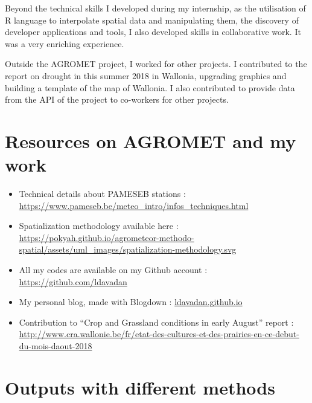 \documentclass[12pt,twoside]{reedthesis}
\theoremstyle{definition}
\theoremstyle{definition}
\theoremstyle{definition}
\theoremstyle{remark}
\begin{document}
Beyond the technical skills I developed during my internship, as the
utilisation of R language to interpolate spatial data and manipulating
them, the discovery of developer applications and tools, I also
developed skills in collaborative work. It was a very enriching
experience.

Outside the AGROMET project, I worked for other projects. I contributed
to the report on drought in this summer 2018 in Wallonia, upgrading
graphics and building a template of the map of Wallonia. I also
contributed to provide data from the API of the project to co-workers
for other projects.

\appendix

\chapter{Resources on AGROMET and my
work}\label{resources-on-agromet-and-my-work}
\begin{itemize}
\item
  Technical details about PAMESEB stations :
  \url{https://www.pameseb.be/meteo_intro/infos_techniques.html}
\item
  Spatialization methodology available here :
  \url{https://pokyah.github.io/agrometeor-methodo-spatial/assets/uml_images/spatialization-methodology.svg}
\item
  All my codes are available on my Github account :
  \url{https://github.com/ldavadan}
\item
  My personal blog, made with Blogdown : \url{ldavadan.github.io}
\item
  Contribution to ``Crop and Grassland conditions in early August''
  report :
  \url{http://www.cra.wallonie.be/fr/etat-des-cultures-et-des-prairies-en-ce-debut-du-mois-daout-2018}
\end{itemize}
\chapter{Outputs with different
methods}\label{outputs-with-different-methods}
\end{document}
